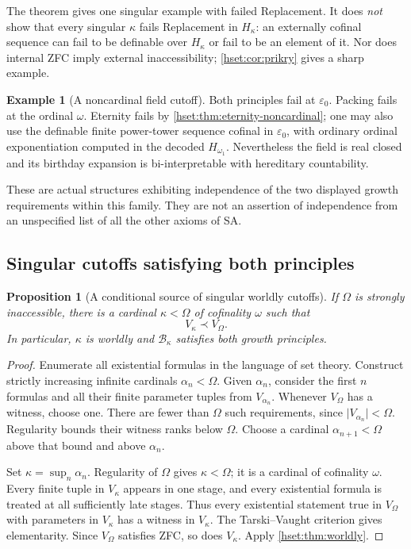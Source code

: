 \documentclass[11pt,letterpaper]{article}
\newtheorem{proposition}[proposition]{Proposition}\aliascntresetthe{proposition}
\theoremstyle{definition}
\newtheorem{example}[example]{Example}\aliascntresetthe{example}
\theoremstyle{remark}
\newcommand{\B}{\mathcal B}
\newcommand{\card}[1]{\lvert#1\rvert}
\begin{document}
The theorem gives one singular example with failed Replacement. It does
\emph{not} show that every singular $\kappa$ fails Replacement in $H_\kappa$: an
externally cofinal sequence can fail to be definable over $H_\kappa$ or fail to
be an element of it. Nor does internal ZFC imply external inaccessibility;
\cref{hset:cor:prikry} gives a sharp example.

\begin{example}[A noncardinal field cutoff]
Both principles fail at $\varepsilon_0$. Packing fails at the ordinal
$\omega$. Eternity fails by \cref{hset:thm:eternity-noncardinal}; one may also
use the definable finite power-tower sequence cofinal in $\varepsilon_0$,
with ordinary ordinal exponentiation computed in the decoded
$H_{\omega_1}$. Nevertheless the field is real closed and its birthday
expansion is bi-interpretable with hereditary countability.
\end{example}

These are actual structures exhibiting independence of the two displayed
growth requirements within this family. They are not an assertion of
independence from an unspecified list of all the other axioms of SA.

\subsection{Singular cutoffs satisfying both principles}

\begin{proposition}[A conditional source of singular worldly cutoffs]
\label{hset:prop:singular-worldly}
If $\Omega$ is strongly inaccessible, there is a cardinal $\kappa<\Omega$
of cofinality $\omega$ such that
\[
 V_\kappa\prec V_\Omega.
\]
In particular, $\kappa$ is worldly and $\B_\kappa$ satisfies both growth
principles.
\end{proposition}
\begin{proof}
Enumerate all existential formulas in the language of set theory. Construct
strictly increasing infinite cardinals $\alpha_n<\Omega$. Given
$\alpha_n$, consider the first $n$ formulas and all their finite parameter
tuples from $V_{\alpha_n}$. Whenever $V_\Omega$ has a witness, choose one.
There are fewer than $\Omega$ such requirements, since
$\card{V_{\alpha_n}}<\Omega$. Regularity bounds their witness ranks below
$\Omega$. Choose a cardinal $\alpha_{n+1}<\Omega$ above that bound and above
$\alpha_n$.

Set $\kappa=\sup_n\alpha_n$. Regularity of $\Omega$ gives $\kappa<\Omega$;
it is a cardinal of cofinality $\omega$. Every finite tuple in $V_\kappa$
appears in one stage, and every existential formula is treated at all
sufficiently late stages. Thus every existential statement true in
$V_\Omega$ with parameters in $V_\kappa$ has a witness in $V_\kappa$.
The Tarski--Vaught criterion gives elementarity. Since $V_\Omega$ satisfies
ZFC, so does $V_\kappa$. Apply \cref{hset:thm:worldly}.
\end{proof}
\end{document}
